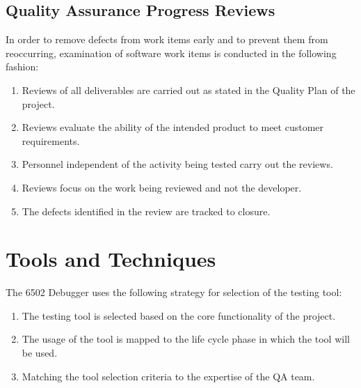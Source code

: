 \documentclass[a3paper, 11pt]{article}
\begin{document}
\subsection{Quality Assurance Progress Reviews}
In order to remove defects from work items early and to prevent them from reoccurring, examination of software work items is conducted in the following fashion:
\begin{enumerate}
	\setlength\itemsep{-0.25em}
	\item Reviews of all deliverables are carried out as stated in the Quality Plan of the project. 
	\item Reviews evaluate the ability of the intended product to meet customer requirements.
	\item Personnel independent of the activity being tested carry out the reviews. 
	\item Reviews focus on the work being reviewed and not the developer.
	\item The defects identified in the review are tracked to closure.
\end{enumerate}
\par


\section{Tools and Techniques}
The 6502 Debugger uses the following strategy for selection of the testing tool:
\begin{enumerate}
	\setlength\itemsep{-0.25em}
	\item The testing tool is selected based on the core functionality of the project. 
	\item The usage of the tool is mapped to the life cycle phase in which the tool will be used. 
	\item Matching the tool selection criteria to the expertise of the QA team.
\end{enumerate}
\end{document}
